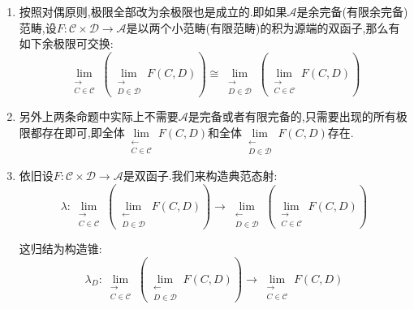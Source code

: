 \begin{enumerate}
\begin{proof}
        于是我们证明了前一个图表是交换的.这说明$\{\lambda_D\}$构成了一个锥,所以存在唯一的态射$\lambda:\lim\limits_{\leftarrow}L\to\lim\limits_{\substack{\leftarrow\\C\in\mathscr{C}}}\left(\lim\limits_{\substack{\leftarrow\\D\in\mathscr{D}}}F(C,D)\right)$.对偶的构造另一侧的自然变换$\mu$.最后我们只需验证$\mu\circ\lambda=1$和$\lambda\circ\mu=1$.以$\mu\circ\lambda=1$为例,按照极限的泛性质归结为证明对任意$D,C$有$p_D\circ p_C\circ\mu\circ\lambda=p_D\circ p_C$.而这按照构造知是成立的.
	\end{proof}
    \item 按照对偶原则,极限全部改为余极限也是成立的.即如果$\mathscr{A}$是余完备(有限余完备)范畴,设$F:\mathscr{C}\times\mathscr{D}\to\mathscr{A}$是以两个小范畴(有限范畴)的积为源端的双函子,那么有如下余极限可交换:
    $$\lim\limits_{\substack{\rightarrow\\C\in\mathscr{C}}}\left(\lim\limits_{\substack{\rightarrow\\D\in\mathscr{D}}}F(C,D)\right)\cong\lim\limits_{\substack{\rightarrow\\D\in\mathscr{D}}}\left(\lim\limits_{\substack{\rightarrow\\C\in\mathscr{C}}}F(C,D)\right)$$
    \item 另外上两条命题中实际上不需要$\mathscr{A}$是完备或者有限完备的,只需要出现的所有极限都存在即可,即全体$\lim\limits_{\substack{\leftarrow\\C\in\mathscr{C}}}F(C,D)$和全体$\lim\limits_{\substack{\leftarrow\\D\in\mathscr{D}}}F(C,D)$存在.
    \item 依旧设$F:\mathscr{C}\times\mathscr{D}\to\mathscr{A}$是双函子.我们来构造典范态射:
    $$\lambda:\lim\limits_{\substack{\rightarrow\\C\in\mathscr{C}}}\left(\lim\limits_{\substack{\leftarrow\\D\in\mathscr{D}}}F(C,D)\right)\to\lim\limits_{\substack{\leftarrow\\D\in\mathscr{D}}}\left(\lim\limits_{\substack{\rightarrow\\C\in\mathscr{C}}}F(C,D)\right)$$
    
    这归结为构造锥:
    $$\lambda_D:\lim\limits_{\substack{\rightarrow\\C\in\mathscr{C}}}\left(\lim\limits_{\substack{\leftarrow\\D\in\mathscr{D}}}F(C,D)\right)\to\lim\limits_{\substack{\rightarrow\\C\in\mathscr{C}}}F(C,D)$$
    

\end{enumerate}
